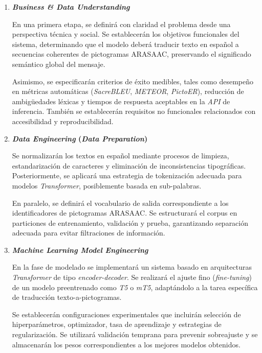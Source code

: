 \documentclass[10pt,letterpaper]{article}
\begin{document}
\begin{enumerate}

    \item \textbf{\textit{Business \& Data Understanding}}

    En una primera etapa, se definirá con claridad el problema desde una perspectiva técnica y social. Se establecerán los objetivos funcionales del sistema, determinando que el modelo deberá traducir texto en español a secuencias coherentes de pictogramas ARASAAC, preservando el significado semántico global del mensaje.

    Asimismo, se especificarán criterios de éxito medibles, tales como desempeño en métricas automáticas (\textit{SacreBLEU}, \textit{METEOR}, \textit{PictoER}), reducción de ambigüedades léxicas y tiempos de respuesta aceptables en la \textit{API} de inferencia. También se establecerán requisitos no funcionales relacionados con accesibilidad y reproducibilidad.

    \item \textbf{\textit{Data Engineering} (\textit{Data Preparation})}

    Se normalizarán los textos en español mediante procesos de limpieza, estandarización de caracteres y eliminación de inconsistencias tipográficas. Posteriormente, se aplicará una estrategia de tokenización adecuada para modelos \textit{Transformer}, posiblemente basada en sub-palabras.

    En paralelo, se definirá el vocabulario de salida correspondiente a los identificadores de pictogramas ARASAAC. Se estructurará el corpus en particiones de entrenamiento, validación y prueba, garantizando separación adecuada para evitar filtraciones de información.

    \item \textbf{\textit{Machine Learning Model Engineering}}

    En la fase de modelado se implementará un sistema basado en arquitecturas \textit{Transformer} de tipo \textit{encoder-decoder}. Se realizará el ajuste fino (\textit{fine-tuning}) de un modelo preentrenado como \textit{T5} o \textit{mT5}, adaptándolo a la tarea específica de traducción texto-a-pictogramas.

    Se establecerán configuraciones experimentales que incluirán selección de hiperparámetros, optimizador, tasa de aprendizaje y estrategias de regularización. Se utilizará validación temprana para prevenir sobreajuste y se almacenarán los pesos correspondientes a los mejores modelos obtenidos.
    

\end{enumerate}
\end{document}
